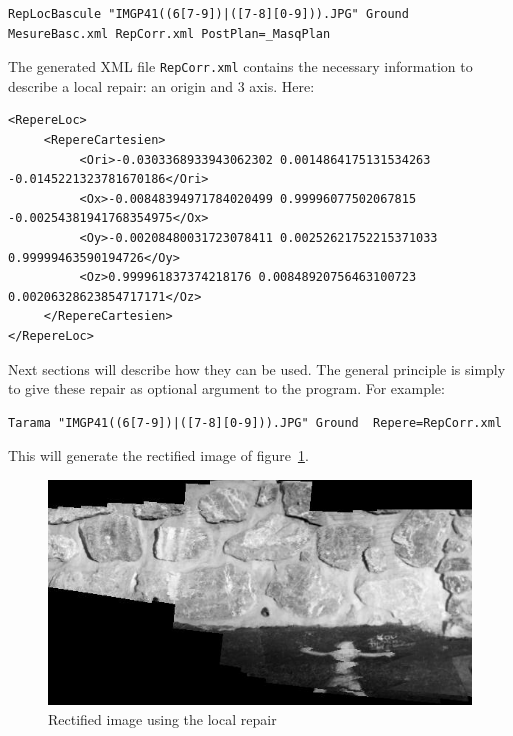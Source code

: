 \begin{verbatim}
RepLocBascule "IMGP41((6[7-9])|([7-8][0-9])).JPG" Ground MesureBasc.xml RepCorr.xml PostPlan=_MasqPlan
\end{verbatim}

The generated XML file {\tt RepCorr.xml} contains the necessary information to
describe a local repair: an origin and $3$ axis. Here:

\begin{verbatim}
<RepereLoc>
     <RepereCartesien>
          <Ori>-0.0303368933943062302 0.0014864175131534263 -0.0145221323781670186</Ori>
          <Ox>-0.00848394971784020499 0.99996077502067815 -0.00254381941768354975</Ox>
          <Oy>-0.00208480031723078411 0.00252621752215371033 0.99999463590194726</Oy>
          <Oz>0.999961837374218176 0.00848920756463100723 0.00206328623854717171</Oz>
     </RepereCartesien>
</RepereLoc>
\end{verbatim}

Next sections will describe how they can be used. The general principle is
simply to give these repair as optional argument to the program. For
example:

\begin{verbatim}
Tarama "IMGP41((6[7-9])|([7-8][0-9])).JPG" Ground  Repere=RepCorr.xml
\end{verbatim}

This will generate the rectified image of figure~\ref{FIG:OkRec:StMartin}.
 
\begin{figure}
\begin{center}
\includegraphics[width=120mm]{FIGS/MurSaintMartin/TA_OK-LeChantier.jpg}
\end{center}
\caption{Rectified image using the local repair}
\label{FIG:OkRec:StMartin}
\end{figure}



